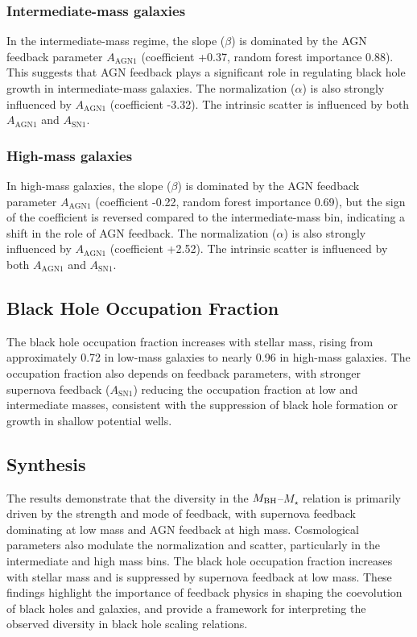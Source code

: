 \documentclass[twocolumn]{aastex631}
\begin{document}
\subsubsection{Intermediate-mass galaxies}

In the intermediate-mass regime, the slope ($\beta$) is dominated by the AGN feedback parameter $A_\mathrm{AGN1}$ (coefficient +0.37, random forest importance 0.88). This suggests that AGN feedback plays a significant role in regulating black hole growth in intermediate-mass galaxies. The normalization ($\alpha$) is also strongly influenced by $A_\mathrm{AGN1}$ (coefficient -3.32). The intrinsic scatter is influenced by both $A_\mathrm{AGN1}$ and $A_\mathrm{SN1}$.

\subsubsection{High-mass galaxies}

In high-mass galaxies, the slope ($\beta$) is dominated by the AGN feedback parameter $A_\mathrm{AGN1}$ (coefficient -0.22, random forest importance 0.69), but the sign of the coefficient is reversed compared to the intermediate-mass bin, indicating a shift in the role of AGN feedback. The normalization ($\alpha$) is also strongly influenced by $A_\mathrm{AGN1}$ (coefficient +2.52). The intrinsic scatter is influenced by both $A_\mathrm{AGN1}$ and $A_\mathrm{SN1}$.

\subsection{Black Hole Occupation Fraction}

The black hole occupation fraction increases with stellar mass, rising from approximately 0.72 in low-mass galaxies to nearly 0.96 in high-mass galaxies. The occupation fraction also depends on feedback parameters, with stronger supernova feedback ($A_\mathrm{SN1}$) reducing the occupation fraction at low and intermediate masses, consistent with the suppression of black hole formation or growth in shallow potential wells.

\subsection{Synthesis}

The results demonstrate that the diversity in the $M_{\rm BH}$--$M_{\star}$ relation is primarily driven by the strength and mode of feedback, with supernova feedback dominating at low mass and AGN feedback at high mass. Cosmological parameters also modulate the normalization and scatter, particularly in the intermediate and high mass bins. The black hole occupation fraction increases with stellar mass and is suppressed by supernova feedback at low mass. These findings highlight the importance of feedback physics in shaping the coevolution of black holes and galaxies, and provide a framework for interpreting the observed diversity in black hole scaling relations.
\end{document}
